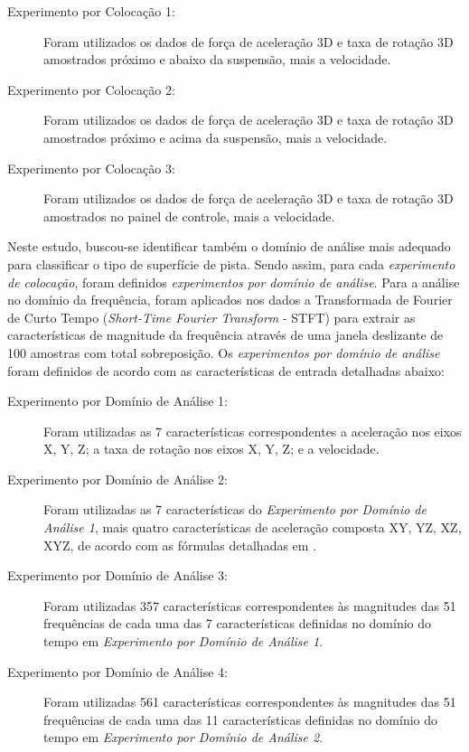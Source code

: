 \begin{description}
	
	\item[Experimento por Colocação 1:] Foram utilizados os dados de força de aceleração 3D e taxa de rotação 3D amostrados próximo e abaixo da suspensão, mais a velocidade.
    
    \item[Experimento por Colocação 2:] Foram utilizados os dados de força de aceleração 3D e taxa de rotação 3D amostrados próximo e acima da suspensão, mais a velocidade.
    
    \item[Experimento por Colocação 3:] Foram utilizados os dados de força de aceleração 3D e taxa de rotação 3D amostrados no painel de controle, mais a velocidade.
    
\end{description}

Neste estudo, buscou-se identificar também o domínio de análise mais adequado para classificar o tipo de superfície de pista. Sendo assim, para cada \emph{experimento de colocação}, foram definidos \emph{experimentos por domínio de análise}. Para a análise no domínio da frequência, foram aplicados nos dados a Transformada de Fourier de Curto Tempo (\textit{Short-Time Fourier Transform} - STFT) para extrair as características de magnitude da frequência através de uma janela deslizante de 100 amostras com total sobreposição. Os \emph{experimentos por domínio de análise} foram definidos de acordo com as características de entrada detalhadas abaixo:

\begin{description}

    \item[Experimento por Domínio de Análise 1:] Foram utilizadas as 7 características correspondentes a aceleração nos eixos X, Y, Z; a taxa de rotação nos eixos X, Y, Z; e a velocidade.
    
    \item[Experimento por Domínio de Análise 2:] Foram utilizadas as 7 características do \emph{Experimento por Domínio de Análise 1}, mais quatro características de aceleração composta XY, YZ, XZ, XYZ, de acordo com as fórmulas detalhadas em \cite{Tan2019}.
    
    \item[Experimento por Domínio de Análise 3:] Foram utilizadas 357 características correspondentes às magnitudes das 51 frequências de cada uma das 7 características definidas no domínio do tempo em \emph{Experimento por Domínio de Análise 1}.
    
    \item[Experimento por Domínio de Análise 4:] Foram utilizadas 561 características correspondentes às magnitudes das 51 frequências de cada uma das 11 características definidas no domínio do tempo em \emph{Experimento por Domínio de Análise 2}.
    
\end{description}

